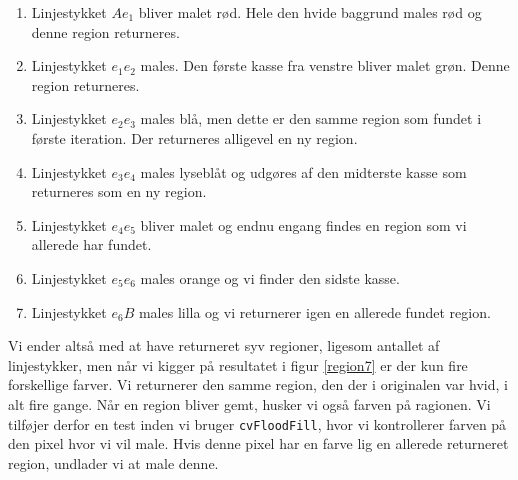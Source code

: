 {\begin{enumerate}
    \item Linjestykket $Ae_1$ bliver malet rød. Hele den hvide baggrund
        males rød og denne region returneres.
    \item Linjestykket $e_1e_2$ males. Den første kasse fra venstre
        bliver malet grøn. Denne region returneres.
    \item Linjestykket $e_2e_3$ males blå, men dette er den samme region som
        fundet i første iteration. Der returneres alligevel en ny
        region.
    \item Linjestykket $e_3e_4$ males lyseblåt og udgøres af den
        midterste kasse som returneres som en ny region.
    \item Linjestykket $e_4e_5$ bliver malet og endnu engang findes en
        region som vi allerede har fundet.
    \item Linjestykket $e_5e_6$ males orange og vi finder den sidste
        kasse.
    \item Linjestykket $e_6B$ males lilla og vi returnerer igen en
        allerede fundet region.
\end{enumerate}
Vi ender altså med at have returneret syv regioner, ligesom antallet af
linjestykker, men når vi kigger på resultatet i figur \ref{region7} er
der kun fire forskellige farver. Vi returnerer den samme region, den der i
originalen var hvid, i alt fire gange. Når en region bliver gemt, husker
vi også farven på ragionen. Vi tilføjer derfor en test inden
vi bruger \texttt{cvFloodFill}, hvor vi kontrollerer farven på den pixel
hvor vi vil male. Hvis denne pixel har en farve lig en allerede
returneret region, undlader vi at male denne.

}
